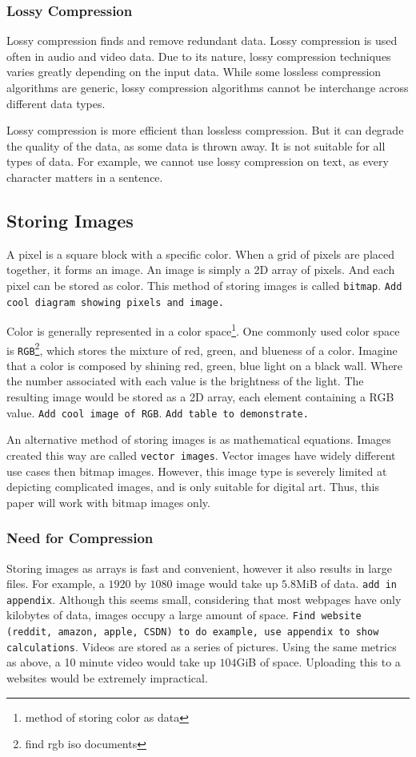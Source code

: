 \documentclass{article}
\begin{document}
\subsubsection{Lossy Compression}
Lossy compression finds and remove redundant data.
Lossy compression is used often in audio and video data.
Due to its nature, lossy compression techniques varies greatly depending on the input data.
While some lossless compression algorithms are generic, lossy compression algorithms cannot be interchange across different data types.

Lossy compression is more efficient than lossless compression.
But it can degrade the quality of the data, as some data is thrown away.
It is not suitable for all types of data.
For example, we cannot use lossy compression on text, as every character matters in a sentence.

\subsection{Storing Images}
A pixel is a square block with a specific color.
When a grid of pixels are placed together, it forms an image.
An image is simply a 2D array of pixels.
And each pixel can be stored as color.
This method of storing images is called \texttt{bitmap}.
\texttt{Add cool diagram showing pixels and image.}

Color is generally represented in a color space\footnote{method of storing color as data}.
One commonly used color space is \texttt{RGB}\footnote{find rgb iso documents}, which stores the mixture of red, green, and blueness of a color.
Imagine that a color is composed by shining red, green, blue light on a black wall.
Where the number associated with each value is the brightness of the light.
The resulting image would be stored as a 2D array, each element containing a RGB value.
\texttt{Add cool image of RGB}.
\texttt{Add table to demonstrate.}

An alternative method of storing images is as mathematical equations.
Images created this way are called \texttt{vector images}.
Vector images have widely different use cases then bitmap images.
However, this image type is severely limited at depicting complicated images, and is only suitable for digital art.
Thus, this paper will work with bitmap images only.

\subsubsection{Need for Compression}
Storing images as arrays is fast and convenient, however it also results in large files.
For example, a $1920$ by $1080$ image would take up $5.8$MiB of data.
\texttt{add in appendix}.
Although this seems small, considering that most webpages have only kilobytes of data, images occupy a large amount of space. 
\texttt{Find website (reddit, amazon, apple, CSDN) to do example, use appendix to show calculations}.
Videos are stored as a series of pictures.
Using the same metrics as above, a 10 minute video would take up $104$GiB of space.
Uploading this to a websites would be extremely impractical.
\end{document}
